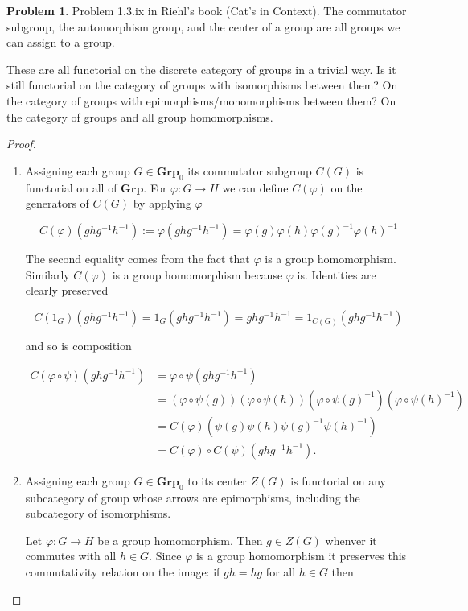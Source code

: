 \documentclass[11pt]{amsart}
\theoremstyle{plain}
\theoremstyle{definition}
\newtheorem{prob}{Problem}
\newcommand{\Grp}{\mathbf{Grp}}
\newcommand{\noi}{{\noindent}}
\begin{document}
\begin{prob}
Problem 1.3.ix in Riehl's book (Cat's in Context). The commutator subgroup, the automorphism group, and the center of a group are all groups we can assign to a group. \medskip

These are all functorial on the discrete category of groups in a trivial way. Is it still functorial on the category of groups with isomorphisms between them? On the category of groups with epimorphisms/monomorphisms between them? On the category of groups and all group homomorphisms. 
\end{prob}
\begin{proof}\
\begin{enumerate}[label=(\alph*)]
\item Assigning each group $G \in \Grp_0$ its commutator subgroup $C(G)$ is functorial on all of $\Grp$. For $\varphi : G \to H$ we can define $C(\varphi)$ on the generators of $C(G)$ by applying $\varphi$

\[ 
C(\varphi)(ghg^{-1}h^{-1}) 
:= \varphi(ghg^{-1}h^{-1}) 
= \varphi(g) \varphi(h) \varphi(g)^{-1} \varphi(h)^{-1} 
\]

\noi The second equality comes from the fact that $\varphi$ is a group homomorphism. Similarly $C(\varphi)$ is a group homomorphism because $\varphi$ is. Identities are clearly preserved


\[ C(1_G)(ghg^{-1}h^{-1}) = 1_G(ghg^{-1}h^{-1}) =ghg^{-1}h^{-1} = 1_{C(G)} (ghg^{-1}h^{-1})\]

\noi and so is composition 

\begin{align*} 
C(\varphi \circ \psi) (ghg^{-1}h^{-1}) 
&= \varphi \circ \psi (ghg^{-1}h^{-1}) \\
&=  (\varphi \circ \psi (g)) (\varphi \circ \psi(h)) (\varphi \circ \psi(g)^{-1})(\varphi \circ \psi(h)^{-1})\\ 
&= C(\varphi) \left(\psi (g) \psi(h) \psi(g)^{-1} \psi(h)^{-1} \right)\\ 
&= C(\varphi) \circ C(\psi) ( ghg^{-1}h^{-1}).
\end{align*}\bigskip

\item Assigning each group $G \in \Grp_0$ to its center $Z(G)$ is functorial on any subcategory of group whose arrows are epimorphisms, including the subcategory of isomorphisms.  \bigskip 

Let $\varphi : G \to H$ be a group homomorphism. Then $g \in Z(G)$ whenver it commutes with all $h \in G$. Since $\varphi$ is a group homomorphism it preserves this commutativity relation on the image: if $gh = hg$ for all $h \in G$ then 


\end{enumerate}
\end{proof}
\end{document}
